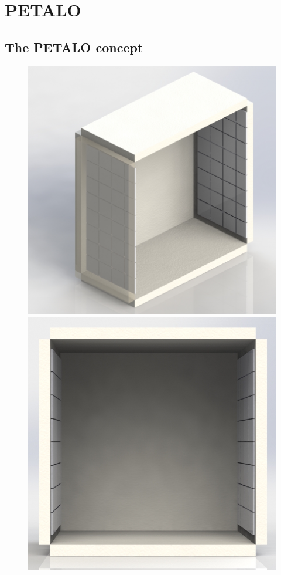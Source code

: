 \documentclass[11pt,a4paper]{article}
\begin{document}
\section{PETALO}\label{sec.PET}

\subsection*{The PETALO concept}

\begin{figure}[!htbp]
	\centering
	\includegraphics[scale=0.20]{img/Box_2faces_1.jpg}
	\includegraphics[scale=0.20758]{img/Box_2faces_3.jpg}

\end{figure}
\end{document}
